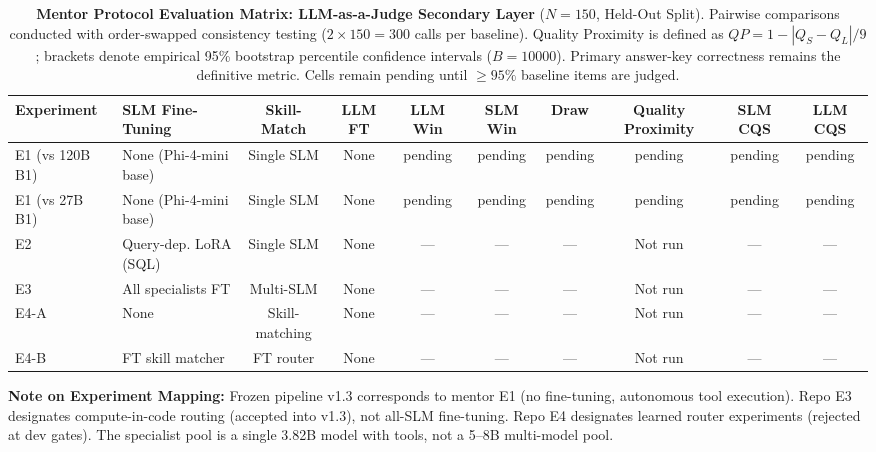 \begin{table}[t]
\centering
\small
\caption{\textbf{Mentor Protocol Evaluation Matrix: LLM-as-a-Judge Secondary Layer} ($N=150$, Held-Out Split). Pairwise comparisons conducted with order-swapped consistency testing ($2 \times 150 = 300$ calls per baseline). Quality Proximity is defined as $QP = 1 - |Q_S - Q_L|/9$; brackets denote empirical 95\% bootstrap percentile confidence intervals ($B=10000$). Primary answer-key correctness remains the definitive metric. Cells remain pending until $\ge 95\%$ baseline items are judged.}
\label{tab:mentor_protocol_results}
\begin{tabular}{llcccccccc}
\toprule
\textbf{Experiment} & \textbf{SLM Fine-Tuning} & \textbf{Skill-Match} & \textbf{LLM FT} & \textbf{LLM Win} & \textbf{SLM Win} & \textbf{Draw} & \textbf{Quality Proximity} & \textbf{SLM CQS} & \textbf{LLM CQS} \\
\midrule
E1 (vs 120B B1) & None (Phi-4-mini base) & Single SLM & None & pending & pending & pending & pending & pending & pending \\
E1 (vs 27B B1) & None (Phi-4-mini base) & Single SLM & None & pending & pending & pending & pending & pending & pending \\
E2 & Query-dep. LoRA (SQL) & Single SLM & None & — & — & — & Not run & — & — \\
E3 & All specialists FT & Multi-SLM & None & — & — & — & Not run & — & — \\
E4-A & None & Skill-matching & None & — & — & — & Not run & — & — \\
E4-B & FT skill matcher & FT router & None & — & — & — & Not run & — & — \\
\bottomrule
\end{tabular}
\begin{tablenotes}
\small
\item \textbf{Note on Experiment Mapping:} Frozen pipeline v1.3 corresponds to mentor E1 (no fine-tuning, autonomous tool execution). Repo E3 designates compute-in-code routing (accepted into v1.3), not all-SLM fine-tuning. Repo E4 designates learned router experiments (rejected at dev gates). The specialist pool is a single 3.82B model with tools, not a 5–8B multi-model pool.
\end{tablenotes}
\end{table}
